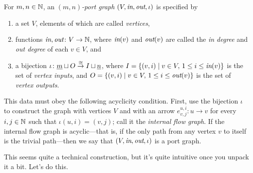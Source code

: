 \documentclass[7Sketches]{subfiles}
\begin{document}
\begin{definition}%
\label{def.port_graph}%
For $m,n\in\mathbb{N}$, an \emph{$(m,n)$-port graph} $(V,\textit{in},\textit{out}, \iota)$ is
specified by
\begin{enumerate}[label=(\roman*)]
\item a set $V$, elements of which are called \emph{vertices},
\item functions $\textit{in},\textit{out} \colon V \to \mathbb{N}$, where $\textit{in}(v)$ and
$\textit{out}(v)$ are called the \emph{in degree} and \emph{out degree} of each $v \in V$, and
\item a bijection $\iota\colon \underline{{m}} \sqcup O \stackrel{\cong}{\to} I \sqcup
\underline{{n}}$, where $I=\{(v,i)\mid v \in V, \, 1 \le i \le \textit{in}(v)\}$ is the set of
\emph{vertex inputs}, and $O=\{(v,i)\mid v \in V,\, 1 \le i \le \textit{out}(v)\}$ is
the set of \emph{vertex outputs}.
\end{enumerate}
This data must obey the following acyclicity condition. First, use the bijection
$\iota$ to construct the graph with vertices $V$ and with
an arrow $e^{u,i}_{v,j}\colon u \to v$ for every $i,j \in \mathbb{N}$ such that
$\iota(u,i)=(v,j)$; call it the \emph{internal flow graph}. If the internal flow graph is acyclic---that is, if the only
path from any vertex $v$ to itself is the trivial path---then we say that
$(V,\textit{in},\textit{out}, \iota)$ is a port graph.%
%
\end{definition}

This seems quite a technical construction, but it's quite intuitive once you
unpack it a bit. Let's do this.
\end{document}
